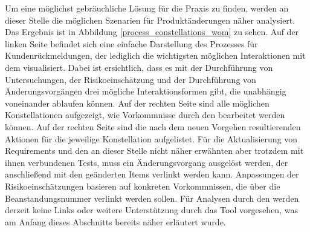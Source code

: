\documentclass[a4paper,12pt]{report}
\begin{document}
Um eine möglichst gebräuchliche Lösung für die Praxis zu finden, werden an dieser Stelle die möglichen Szenarien für Produktänderungen näher analysiert. Das Ergebnis ist in Abbildung \ref{process_constellations_wom} zu sehen. Auf der linken Seite befindet sich eine einfache Darstellung des Prozesses für Kundenrückmeldungen, der lediglich die wichtigsten möglichen Interaktionen mit dem \FE visualisiert. Dabei ist ersichtlich, dass es mit der Durchführung von Untersuchungen, der Risikoeinschätzung und der Durchführung von Änderungsvorgängen drei mögliche Interaktionsformen gibt, die unabhängig voneinander ablaufen können. Auf der rechten Seite sind alle möglichen Konstellationen aufgezeigt, wie Vorkommnisse durch den \FE bearbeitet werden können. Auf der rechten Seite sind die nach dem neuen Vorgehen resultierenden Aktionen für die jeweilige Konstellation aufgelistet. Für die Aktualisierung von Requirements und den an dieser Stelle nicht näher erwähnten aber trotzdem mit ihnen verbundenen Tests, muss ein Änderungsvorgang ausgelöst werden, der anschließend mit den geänderten Items verlinkt werden kann. Anpassungen der Risikoeinschätzungen basieren auf konkreten Vorkommnissen, die über die Beanstandungsnummer verlinkt werden sollen. Für Analysen durch den \FE werden derzeit keine Links oder weitere Unterstützung durch das Tool vorgesehen, was am Anfang dieses Abschnitts bereits näher erläutert wurde.
\end{document}
